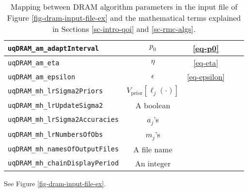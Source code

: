 \begin{sidewaystable}[h]
\begin{center}
\begin{tabular}{|l|c|c|c|c|}
\verb=uqDRAM_am_adaptInterval=           & $p_0$                             & \eqref{eq-p0}                                & \pageref{eq-p0}                                  &               \\
\hline
\verb=uqDRAM_am_eta=                     & $\eta$                            & \eqref{eq-eta}                               & \pageref{eq-eta}                                 &               \\
\hline
\verb=uqDRAM_am_epsilon=                 & $\epsilon$                        & \eqref{eq-epsilon}                           & \pageref{eq-epsilon}                             &               \\
\hline
\verb=uqDRAM_mh_lrSigma2Priors=          & $V_{\text{prior}}[\ell_j(\cdot)]$ &                                              &                                                  &               \\
\hline
\verb=uqDRAM_mh_lrUpdateSigma2=          & A boolean                         &                                              &                                                  &               \\
\hline
\verb=uqDRAM_mh_lrSigma2Accuracies=      & $a_j$'s                           &                                              &                                                  &               \\
\hline
\verb=uqDRAM_mh_lrNumbersOfObs=          & $m_j$'s                           &                                              &                                                  &               \\
\hline
\verb=uqDRAM_mh_namesOfOutputFiles=      & A file name                       &                                              &                                                  &               \\
\hline
\verb=uqDRAM_mh_chainDisplayPeriod=      & An integer                        &                                              &                                                  &               \\
\hline
\end{tabular}
\caption{Mapping between DRAM algorithm parameters in the input file of Figure \ref{fig-dram-input-file-ex} and the mathematical terms explained in Sections \ref{sc-intro-qoi} and \ref{sc-rmc-algs}.
}
\label{tab-dram-map}
\end{center}
\end{sidewaystable}

See Figure \ref{fig-dram-input-file-ex}.

